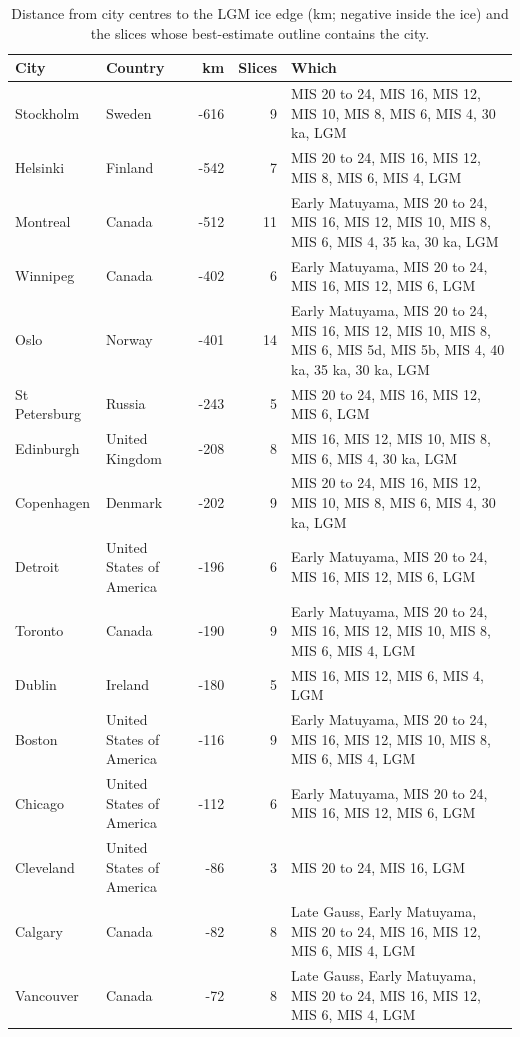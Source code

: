 \documentclass[11pt,a4paper]{article}
\begin{document}
\begin{table}[tbp]\centering\scriptsize\setlength{\tabcolsep}{3pt}\caption{Distance from city centres to the LGM ice edge (km; negative inside the ice) and the slices whose best-estimate outline contains the city.}\label{tab:cities}\begin{tabular}{llrrp{7.2cm}}\toprule City & Country & km & Slices & Which\\\midrule
Stockholm & Sweden & -616 & 9 & MIS 20 to 24, MIS 16, MIS 12, MIS 10, MIS 8, MIS 6, MIS 4, 30 ka, LGM\\
Helsinki & Finland & -542 & 7 & MIS 20 to 24, MIS 16, MIS 12, MIS 8, MIS 6, MIS 4, LGM\\
Montreal & Canada & -512 & 11 & Early Matuyama, MIS 20 to 24, MIS 16, MIS 12, MIS 10, MIS 8, MIS 6, MIS 4, 35 ka, 30 ka, LGM\\
Winnipeg & Canada & -402 & 6 & Early Matuyama, MIS 20 to 24, MIS 16, MIS 12, MIS 6, LGM\\
Oslo & Norway & -401 & 14 & Early Matuyama, MIS 20 to 24, MIS 16, MIS 12, MIS 10, MIS 8, MIS 6, MIS 5d, MIS 5b, MIS 4, 40 ka, 35 ka, 30 ka, LGM\\
St Petersburg & Russia & -243 & 5 & MIS 20 to 24, MIS 16, MIS 12, MIS 6, LGM\\
Edinburgh & United Kingdom & -208 & 8 & MIS 16, MIS 12, MIS 10, MIS 8, MIS 6, MIS 4, 30 ka, LGM\\
Copenhagen & Denmark & -202 & 9 & MIS 20 to 24, MIS 16, MIS 12, MIS 10, MIS 8, MIS 6, MIS 4, 30 ka, LGM\\
Detroit & United States of America & -196 & 6 & Early Matuyama, MIS 20 to 24, MIS 16, MIS 12, MIS 6, LGM\\
Toronto & Canada & -190 & 9 & Early Matuyama, MIS 20 to 24, MIS 16, MIS 12, MIS 10, MIS 8, MIS 6, MIS 4, LGM\\
Dublin & Ireland & -180 & 5 & MIS 16, MIS 12, MIS 6, MIS 4, LGM\\
Boston & United States of America & -116 & 9 & Early Matuyama, MIS 20 to 24, MIS 16, MIS 12, MIS 10, MIS 8, MIS 6, MIS 4, LGM\\
Chicago & United States of America & -112 & 6 & Early Matuyama, MIS 20 to 24, MIS 16, MIS 12, MIS 6, LGM\\
Cleveland & United States of America & -86 & 3 & MIS 20 to 24, MIS 16, LGM\\
Calgary & Canada & -82 & 8 & Late Gauss, Early Matuyama, MIS 20 to 24, MIS 16, MIS 12, MIS 6, MIS 4, LGM\\
Vancouver & Canada & -72 & 8 & Late Gauss, Early Matuyama, MIS 20 to 24, MIS 16, MIS 12, MIS 6, MIS 4, LGM\\

\end{tabular}
\end{table}
\end{document}
